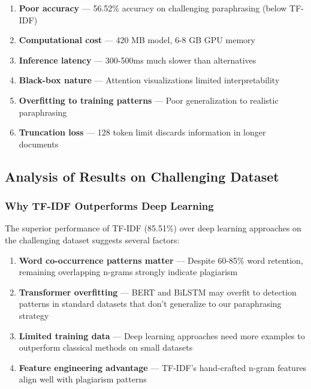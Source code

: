 \begin{enumerate}
  \item \textbf{Poor accuracy} --- 56.52\% accuracy on challenging paraphrasing (below TF-IDF)
  \item \textbf{Computational cost} --- 420 MB model, 6-8 GB GPU memory
  \item \textbf{Inference latency} --- 300-500ms much slower than alternatives
  \item \textbf{Black-box nature} --- Attention visualizations limited interpretability
  \item \textbf{Overfitting to training patterns} --- Poor generalization to realistic paraphrasing
  \item \textbf{Truncation loss} --- 128 token limit discards information in longer documents
\end{enumerate}

\subsection{Analysis of Results on Challenging Dataset}

\subsubsection{Why TF-IDF Outperforms Deep Learning}

The superior performance of TF-IDF (85.51\%) over deep learning approaches on the challenging dataset suggests several factors:

\begin{enumerate}
  \item \textbf{Word co-occurrence patterns matter} --- Despite 60-85\% word retention, remaining overlapping n-grams strongly indicate plagiarism
  
  \item \textbf{Transformer overfitting} --- BERT and BiLSTM may overfit to detection patterns in standard datasets that don't generalize to our paraphrasing strategy
  
  \item \textbf{Limited training data} --- Deep learning approaches need more examples to outperform classical methods on small datasets
  
  \item \textbf{Feature engineering advantage} --- TF-IDF's hand-crafted n-gram features align well with plagiarism patterns
\end{enumerate}

